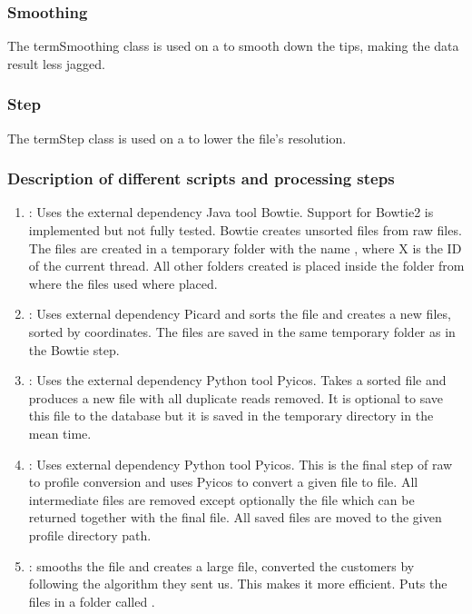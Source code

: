 \subsubsection{Smoothing}
The term{Smoothing} class is used on a  to smooth down the tips, making the data result less jagged.
\subsubsection{Step}
The term{Step} class is used on a  to lower the file's resolution.
\subsubsection{Description of different scripts and processing steps}

\begin{enumerate}
\item {}: Uses the external dependency Java tool Bowtie. 
Support for Bowtie2 is implemented but not fully tested. 
Bowtie creates unsorted  files from  raw files.
The files are created in a temporary folder with the name , where X is the ID of the current thread. 
All other folders created is placed inside the folder from where the files used where placed.

\item {}: Uses external dependency Picard and sorts the  file and creates a new  files, sorted by coordinates.
The files are saved in the same temporary folder as in the Bowtie step.

\item {}: Uses the external dependency Python tool Pyicos.
Takes a sorted  file and produces a new  file with all duplicate reads removed.
It is optional to save this  file to the database but it is saved in the temporary directory in the mean time.

\item {}: Uses external dependency Python tool Pyicos.
This is the final step of raw to profile conversion and uses Pyicos to convert a given  file to  file.
All intermediate files are removed except optionally the  file which can be returned together with the final  file. All saved files are moved to the given profile directory path.

\item {}: smooths the file and creates a large  file,
converted the customers  by following the algorithm they  sent
us. This makes it more efficient. Puts the files in a folder called
.


\end{enumerate}
